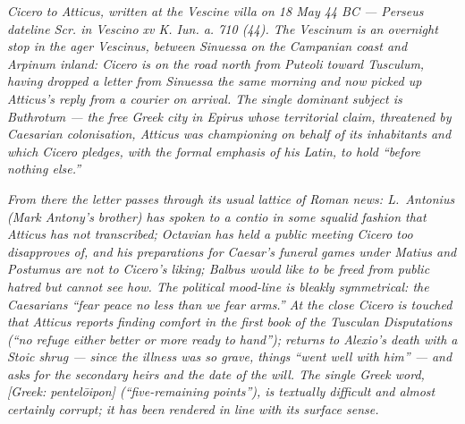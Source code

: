 
\textit{Cicero to Atticus, written at the Vescine villa on 18
May 44 BC --- Perseus dateline \textit{Scr. in Vescino xv K.
Iun. a. 710 (44)}. The Vescinum is an overnight stop in the
ager Vescinus, between Sinuessa on the Campanian coast and
Arpinum inland: Cicero is on the road north from Puteoli toward
Tusculum, having dropped a letter from Sinuessa the same
morning and now picked up Atticus's reply from a courier on
arrival. The single dominant subject is Buthrotum --- the
free Greek city in Epirus whose territorial claim, threatened
by Caesarian colonisation, Atticus was championing on behalf of
its inhabitants and which Cicero pledges, with the formal
emphasis of his Latin, to hold ``before nothing else.''}

\textit{From there the letter passes through its usual lattice
of Roman news: L.~Antonius (Mark Antony's brother) has spoken
to a contio in some squalid fashion that Atticus has not
transcribed; Octavian has held a public meeting Cicero too
disapproves of, and his preparations for Caesar's funeral games
under Matius and Postumus are not to Cicero's liking;
Balbus would like to be freed from public hatred but cannot see
how. The political mood-line is bleakly symmetrical: the
Caesarians ``fear peace no less than we fear arms.'' At the
close Cicero is touched that Atticus reports finding comfort in
the first book of the \textit{Tusculan Disputations} (``no
refuge either better or more ready to hand''); returns to
Alexio's death with a Stoic shrug --- since the illness was so
grave, things ``went well with him'' --- and asks for the
secondary heirs and the date of the will. The single Greek
word, \textit{[Greek: pentel\=oipon]} (``five-remaining
points''), is textually difficult and almost certainly corrupt;
it has been rendered in line with its surface sense.}

